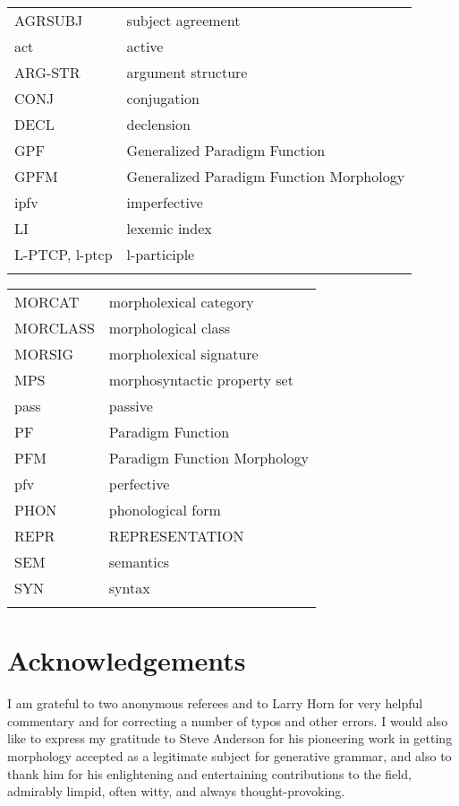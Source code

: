 \documentclass[output=paper,
modfonts
]{LSP/langsci}
\begin{document}
 \begin{tabularx}{.45\textwidth}{lQ} 
AGRSUBJ & subject agreement     \\
act & active         \\
ARG-STR &  {argument structure}     \\
CONJ & conjugation       \\
DECL & declension       \\
GPF & Generalized Paradigm Function    \\
GPFM & Generalized Paradigm Function Morphology\\
ipfv & {imperfective}        \\
LI &  {lexemic index}       \\
L-PTCP, l-ptcp & l-participle      \\
\\
\end{tabularx}
\begin{tabularx}{.45\textwidth}{lQ}
MORCAT & morpholexical category \\
MORCLASS & morphological class     \\
MORSIG & morpholexical signature    \\
MPS &  {morphosyntactic} property set    \\
pass & passive         \\
PF & Paradigm Function      \\
PFM & Paradigm Function Morphology    \\
pfv & perfective        \\
PHON & phonological form     \\
REPR & REPRESENTATION      \\
SEM &  {semantics}        \\
SYN & syntax         \\
\\
\end{tabularx}

\newpage 
\section*{Acknowledgements}
I am grateful to two anonymous referees and to Larry Horn for very helpful commentary and for correcting a number of typos and other errors. I would also like to express my gratitude to Steve Anderson for his pioneering work in getting morphology accepted as a legitimate subject for generative grammar, and also to thank him for his enlightening and entertaining contributions to the field,  admirably limpid,  often witty, and always thought-provoking.

{\sloppy
\printbibliography[heading=subbibliography,notkeyword=this]
}
\end{document}
